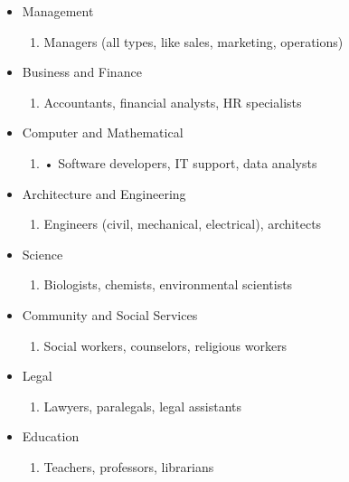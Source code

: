 \begin{enumerate}
    \begin{itemize}
        \item Management
            \begin{enumerate}
                \item Managers (all types, like sales, marketing, operations)
            \end{enumerate}
        \item Business and Finance
            \begin{enumerate}
                \item Accountants, financial analysts, HR specialists
            \end{enumerate}
        \item Computer and Mathematical
            \begin{enumerate}
                \item • Software developers, IT support, data analysts
            \end{enumerate}
        \item Architecture and Engineering
            \begin{enumerate}
                \item Engineers (civil, mechanical, electrical), architects
            \end{enumerate}
        \item Science
            \begin{enumerate}
                \item Biologists, chemists, environmental scientists
            \end{enumerate}
        \item Community and Social Services
            \begin{enumerate}
                \item Social workers, counselors, religious workers
            \end{enumerate}
        \item Legal 
            \begin{enumerate}
                \item Lawyers, paralegals, legal assistants
            \end{enumerate}
        \item Education
            \begin{enumerate}
                \item Teachers, professors, librarians
            \end{enumerate}

\end{itemize}
\end{enumerate}
